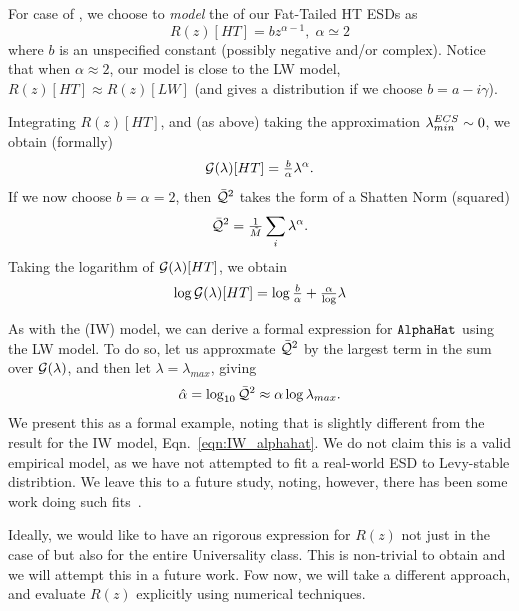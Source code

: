 For case of \IdealLearning,  we choose to \emph{model} the \RTransform of our Fat-Tailed HT ESDs as
\begin{equation}
\label{eqn:LW_model_0} 
R(z)[HT] = bz^{\alpha-1},\;\alpha\simeq 2
\end{equation}
where $b$ is an unspecified constant (possibly negative and/or complex).
Notice that when $\alpha\approx 2$, our model is close to the LW model, $R(z)[HT]\approx R(z)[LW]$
(and gives a \Cauchy distribution if we choose $b=a-i\gamma$).

Integrating $R(z)[HT]$, and (as above) taking the approximation $\lambda^{ECS}_{min}\sim 0$, we obtain (formally)
\begin{equation}
\label{eqn:LW_model_1} 
\mathcal{G(\lambda)}[HT] = \tfrac{b}{\alpha} \lambda^{\alpha}  .
\end{equation}
%
If we now choose $b=\alpha=2$, then  $\bar{\mathcal{Q}}^{2}$ takes the form of a Shatten Norm (squared)
\begin{equation}
  \label{eqn:LW_model_2}
  \bar{\mathcal{Q}}^{2} = \tfrac{1}{\tilde{M}}\sum_{i}\lambda^{\alpha}  .
\end{equation}
%
Taking the logarithm of $\mathcal{G(\lambda)}[HT] $, we obtain
\begin{equation}
\label{eqn:LW_model_3} 
\log \mathcal{G(\lambda)}[HT] =  \log\tfrac{b}{\alpha} +\tfrac{\alpha}\log\lambda
\end{equation}

As with the \InverseWishart (IW) model, we can derive a formal expression for $\texttt{AlphaHat}$ using the LW model.
To do so, let us approxmate $\bar{\mathcal{Q}}^{2}$ by the largest term in the sum over $\mathcal{G(\lambda)}$, and then let $\lambda=\lambda_{max}$, giving
\begin{equation} 
\label{eqn:LW_model_4} 
\hat\alpha = \log_{10} \bar{\mathcal{Q}}^{2} \approx  \alpha\log\lambda_{max}   .
\end{equation}
We present this as a formal example, noting that is slightly different from the result for the IW model, Eqn.~\ref{eqn:IW_alphahat}. 
We do not claim this is a valid empirical model, as we have not attempted to fit a real-world ESD to Levy-stable distribtion.  
We leave this to a future study, noting, however, there has been some work doing such fits~\cite{li2024exploring}.

Ideally, we would like to have an rigorous expression for $R(z)$ not just
in the case of \IdealLearning but also for the entire \FatTailed Universality class.
This is non-trivial to obtain and we will attempt this in a future work.
Fow now, we will take a different approach, and evaluate $R(z)$ explicitly using numerical techniques.

